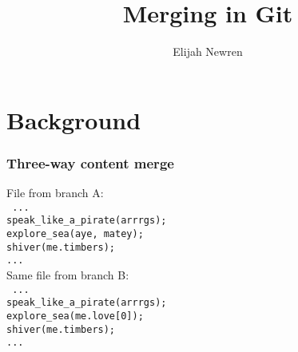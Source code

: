 \documentclass[t]{beamer}
\title{Merging in Git}
\author{Elijah Newren}
\institute{}
\date{}
\begin{document}
\begin{frame}
  \titlepage
\end{frame}


\section{Background}

\begin{frame}
  \frametitle{Three-way content merge}

  \begin{multicols*}{2}
    File from branch A:\\
    {\footnotesize\texttt{%
    ...                             \\
    speak\_like\_a\_pirate(arrrgs); \\
    explore\_sea(aye, matey);\\
    shiver(me.timbers);             \\
    ...                             \\
    }}
    \columnbreak
    \pause
    Same file from branch B:\\
    {\footnotesize\texttt{%
    ...                             \\
    speak\_like\_a\_pirate(arrrgs); \\
    explore\_sea(me.love[0]);\\
    shiver(me.timbers);             \\
    ...
    }}
  \end{multicols*}%

\end{frame}
\end{document}
